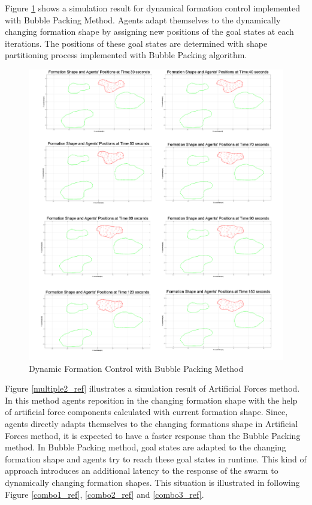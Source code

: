 Figure \ref{multiple1_ref} shows a simulation result for dynamical formation control implemented with Bubble Packing Method. Agents adapt themselves to the dynamically changing formation shape by assigning new positions of the goal states at each iterations. The positions of these goal states are determined with shape partitioning process implemented with Bubble Packing algorithm. 
		 
\begin{figure}[H]
\caption{Dynamic Formation Control with Bubble Packing Method} \label{multiple1_ref}
\centerline{\includegraphics[scale = 0.16]{multiple1}}
\end{figure} 

Figure \ref{multiple2_ref} illustrates a simulation result of Artificial Forces method. In this method agents reposition in the changing formation shape with the help of artificial force components calculated with current formation shape. Since, agents directly adapts themselves to the changing formations shape in Artificial Forces method, it is expected to have a faster response than the Bubble Packing method. In Bubble Packing method, goal states are adapted to the changing formation shape and agents try to reach these goal states in runtime. This kind of approach introduces an additional latency to the response of the swarm to dynamically changing formation shapes. This situation is illustrated in following Figure \ref{combo1_ref}, \ref{combo2_ref} and \ref{combo3_ref}.

